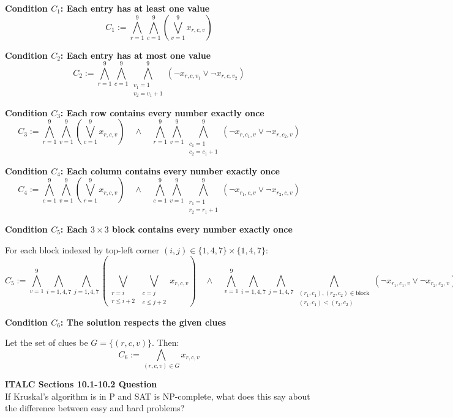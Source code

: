 \documentclass{article}
\theoremstyle{theorem}
\theoremstyle{definition}
\theoremstyle{remark}
\begin{document}
\begin{flushleft}
\textbf{Condition \( C_1 \): Each entry has at least one value}
\[
C_1 := \bigwedge_{r=1}^9 \bigwedge_{c=1}^9 \left( \bigvee_{v=1}^9 x_{r,c,v} \right)
\]

\textbf{Condition \( C_2 \): Each entry has at most one value}
\[
C_2 := \bigwedge_{r=1}^9 \bigwedge_{c=1}^9 \bigwedge_{\substack{v_1=1 \\ v_2 = v_1+1}}^9 \left( \neg x_{r,c,v_1} \lor \neg x_{r,c,v_2} \right)
\]

\textbf{Condition \( C_3 \): Each row contains every number exactly once}
\[
C_3 := \bigwedge_{r=1}^9 \bigwedge_{v=1}^9 \left( \bigvee_{c=1}^9 x_{r,c,v} \right) \quad \land \quad 
\bigwedge_{r=1}^9 \bigwedge_{v=1}^9 \bigwedge_{\substack{c_1=1 \\ c_2 = c_1+1}}^9 \left( \neg x_{r,c_1,v} \lor \neg x_{r,c_2,v} \right)
\]

\textbf{Condition \( C_4 \): Each column contains every number exactly once}
\[
C_4 := \bigwedge_{c=1}^9 \bigwedge_{v=1}^9 \left( \bigvee_{r=1}^9 x_{r,c,v} \right) \quad \land \quad 
\bigwedge_{c=1}^9 \bigwedge_{v=1}^9 \bigwedge_{\substack{r_1=1 \\ r_2 = r_1+1}}^9 \left( \neg x_{r_1,c,v} \lor \neg x_{r_2,c,v} \right)
\]

\textbf{Condition \( C_5 \): Each \( 3 \times 3 \) block contains every number exactly once}

For each block indexed by top-left corner \( (i,j) \in \{1,4,7\} \times \{1,4,7\} \):
\[
C_5 := \bigwedge_{v=1}^9 \bigwedge_{i=1,4,7} \bigwedge_{j=1,4,7} \left( \bigvee_{\substack{r=i \\ r \leq i+2}} \bigvee_{\substack{c=j \\ c \leq j+2}} x_{r,c,v} \right)
\quad \land \quad
\bigwedge_{v=1}^9 \bigwedge_{i=1,4,7} \bigwedge_{j=1,4,7} \bigwedge_{\substack{(r_1,c_1),(r_2,c_2) \in \text{block} \\ (r_1,c_1) < (r_2,c_2)}} \left( \neg x_{r_1,c_1,v} \lor \neg x_{r_2,c_2,v} \right)
\]

\textbf{Condition \( C_6 \): The solution respects the given clues}

Let the set of clues be \( G = \{(r,c,v)\} \). Then:
\[
C_6 := \bigwedge_{(r,c,v) \in G} x_{r,c,v}
\]
\end{flushleft}

\textbf{ITALC Sections 10.1-10.2 Question}\\
If Kruskal’s algorithm is in P and SAT is NP-complete, what does this say about the difference between easy and hard problems?
\end{document}
